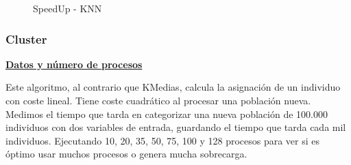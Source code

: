 			\begin{figure} [!h]
				\centering
				\caption{SpeedUp - KNN}
			\end{figure}
			
			\newpage
		
		\subsubsection{Cluster}
		
			\begin{flushleft}
			\begin{mdframed}[roundcorner=5pt]			
				\textbf{\underline{Datos y número de procesos}}
				\vspace{0.1cm}
				
				\scriptsize	
				Este algoritmo, al contrario que KMedias, calcula la asignación de un individuo con coste lineal. Tiene coste cuadrático al procesar una población nueva. Medimos el tiempo que tarda en categorizar una nueva población de 100.000 individuos con dos variables de entrada, guardando el tiempo que tarda cada mil individuos. Ejecutando 10, 20, 35, 50, 75, 100 y 128 procesos para ver si es óptimo usar muchos procesos o genera mucha sobrecarga.
			\end{mdframed}
			\end{flushleft}	

			
